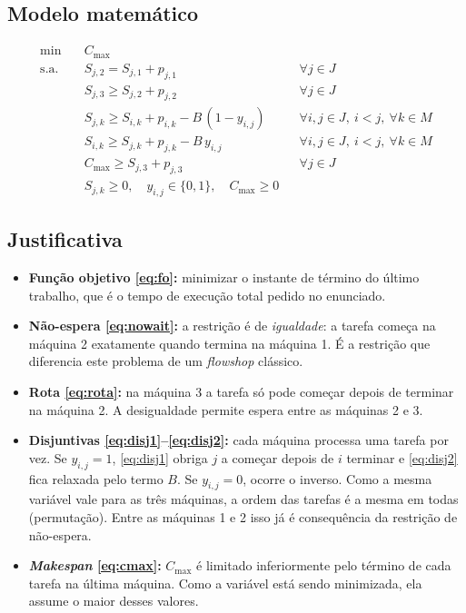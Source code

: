 \subsection{Modelo matemático}
\begin{align}
\min \quad & C_{\max} \label{eq:fo}\\
\text{s.a.} \quad
& S_{j,2} = S_{j,1} + p_{j,1}
  && \forall j \in J \label{eq:nowait}\\
& S_{j,3} \geq S_{j,2} + p_{j,2}
  && \forall j \in J \label{eq:rota}\\
& S_{j,k} \geq S_{i,k} + p_{i,k} - B\,(1 - y_{i,j})
  && \forall i,j \in J,\ i<j,\ \forall k \in M \label{eq:disj1}\\
& S_{i,k} \geq S_{j,k} + p_{j,k} - B\,y_{i,j}
  && \forall i,j \in J,\ i<j,\ \forall k \in M \label{eq:disj2}\\
& C_{\max} \geq S_{j,3} + p_{j,3}
  && \forall j \in J \label{eq:cmax}\\
& S_{j,k} \geq 0,\quad y_{i,j} \in \{0,1\},\quad C_{\max} \geq 0 \label{eq:dom}
\end{align}

\subsection{Justificativa}
\begin{itemize}
  \item \textbf{Função objetivo \eqref{eq:fo}:} minimizar o instante de término
        do último trabalho, que é o tempo de execução total pedido no enunciado.
  \item \textbf{Não-espera \eqref{eq:nowait}:} a restrição é de
        \emph{igualdade}: a tarefa começa na máquina 2 exatamente quando termina
        na máquina 1. É a restrição que diferencia este problema de um
        \textit{flowshop} clássico.
  \item \textbf{Rota \eqref{eq:rota}:} na máquina 3 a tarefa só pode começar
        depois de terminar na máquina 2. A desigualdade permite espera entre as
        máquinas 2 e 3.
  \item \textbf{Disjuntivas \eqref{eq:disj1}--\eqref{eq:disj2}:} cada máquina
        processa uma tarefa por vez. Se $y_{i,j}=1$, \eqref{eq:disj1} obriga $j$ a
        começar depois de $i$ terminar e \eqref{eq:disj2} fica relaxada pelo
        termo $B$. Se $y_{i,j}=0$, ocorre o inverso. Como a mesma variável vale
        para as três máquinas, a ordem das tarefas é a mesma em todas
        (permutação). Entre as máquinas 1 e 2 isso já é consequência da
        restrição de não-espera.
  \item \textbf{\textit{Makespan} \eqref{eq:cmax}:} $C_{\max}$ é limitado
        inferiormente pelo término de cada tarefa na última máquina. Como a
        variável está sendo minimizada, ela assume o maior desses valores.
\end{itemize}

